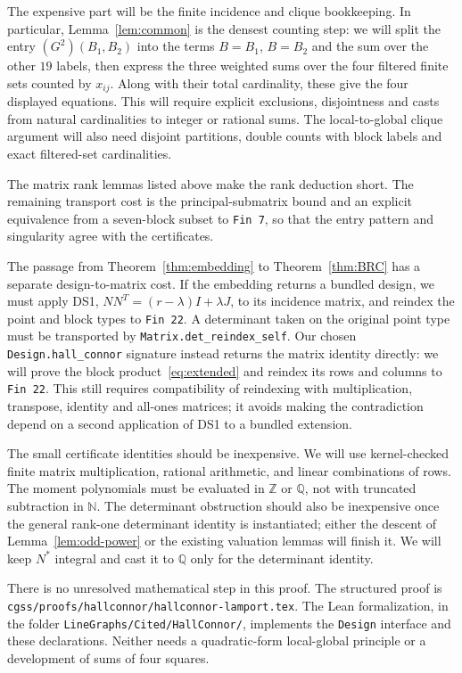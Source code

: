 \documentclass[11pt]{article}
\newcommand\ints{{\mathbb Z}}
\newcommand\nn{{\mathbb N}}%
\newcommand\rats{{\mathbb Q}}
\theoremstyle{definition}
\newcommand{\code}[1]{{\small\nolinkurl{#1}}}
\begin{document}
The expensive part will be the finite incidence and clique bookkeeping.
In particular, Lemma~\ref{lem:common} is the densest counting step:
we will split the entry $(G^2)(B_1,B_2)$ into the terms $B=B_1$,
$B=B_2$ and the sum over the other $19$ labels, then express the
three weighted sums over the four filtered finite sets counted by
$x_{ij}$. Along with their total cardinality, these give the four
displayed equations. This will require explicit exclusions, disjointness
and casts from natural cardinalities to integer or rational sums.
The local-to-global clique argument will also need disjoint partitions,
double counts with block labels and exact filtered-set cardinalities.

The matrix rank lemmas listed above make the rank deduction short.
The remaining transport cost is the principal-submatrix bound and
an explicit equivalence from a seven-block subset to \code{Fin 7},
so that the entry pattern and singularity agree with the certificates.

The passage from Theorem~\ref{thm:embedding} to
Theorem~\ref{thm:BRC} has a separate design-to-matrix cost.
If the embedding returns a bundled design, we must apply DS1,
$NN^T=(r-\lambda)I+\lambda J$, to its incidence matrix, and reindex
the point and block types to \code{Fin 22}. A determinant taken on
the original point type must be transported by
\code{Matrix.det_reindex_self}. Our chosen \code{Design.hall_connor}
signature instead returns the matrix identity directly: we will prove
the block product~\eqref{eq:extended} and reindex its rows and columns
to \code{Fin 22}. This still requires compatibility of reindexing with
multiplication, transpose, identity and all-ones matrices; it avoids
making the contradiction depend on a second application of DS1 to a
bundled extension.

The small certificate identities should be inexpensive. We will use
kernel-checked finite matrix multiplication, rational arithmetic,
and linear combinations of rows. The moment polynomials must be
evaluated in $\ints$ or $\rats$, not with truncated subtraction in
$\nn$. The determinant obstruction should also be inexpensive once
the general rank-one determinant identity is instantiated; either the
descent of Lemma~\ref{lem:odd-power} or the existing valuation lemmas
will finish it. We will keep $N^*$ integral and cast it to $\rats$
only for the determinant identity.

There is no unresolved mathematical step in this proof. The structured
proof is \code{cgss/proofs/hallconnor/hallconnor-lamport.tex}. The Lean
formalization, in the folder \code{LineGraphs/Cited/HallConnor/}, implements
the \code{Design} interface and these declarations. Neither needs a
quadratic-form local-global principle or a development of sums of four
squares.
\end{document}
